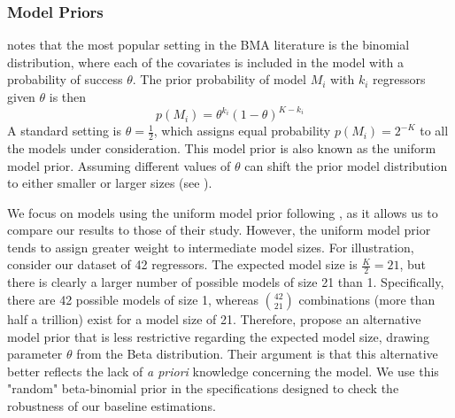 \begin{refsection}
\subsubsection{Model Priors}
\textcite{MoralBenito2012} notes that the most popular setting in the \ac{BMA} literature is the binomial distribution, where each of the covariates is included in the model with a probability of success $\theta$. The prior probability of model $M_{i}$ with $k_{i}$ regressors given $\theta$ is then
\begin{equation}
	p(M_{i})=\theta^{k_{i}}(1-\theta)^{K-k_{i}}
\end{equation}
A standard setting is $\theta=\frac{1}{2}$, which assigns equal probability $p(M_{i}) = 2^{-K}$ to all the models under consideration. This model prior is also known as the uniform model prior. Assuming different values of $\theta$ can shift the prior model distribution to either smaller or larger sizes (see \textcite{Zeugner2011}).

We focus on models using the uniform model prior following \textcite{Fernandezetal2001}, as it allows us to compare our results to those of their study. However, the uniform model prior tends to assign greater weight to intermediate model sizes. For illustration, consider our dataset of 42 regressors. The expected model size is $\frac{K}{2} = 21$, but there is clearly a larger number of possible models of size 21 than 1. Specifically, there are 42 possible models of size 1, whereas ${42\choose 21}$ combinations (more than half a trillion) exist for a model size of 21. Therefore, \textcite{LeySteel2009} propose an alternative model prior that is less restrictive regarding the expected model size, drawing parameter $\theta$ from the Beta distribution. Their argument is that this alternative better reflects the lack of \textit{a priori} knowledge concerning the model. We use this "random" beta-binomial prior in the specifications designed to check the robustness of our baseline estimations.


\end{refsection}
